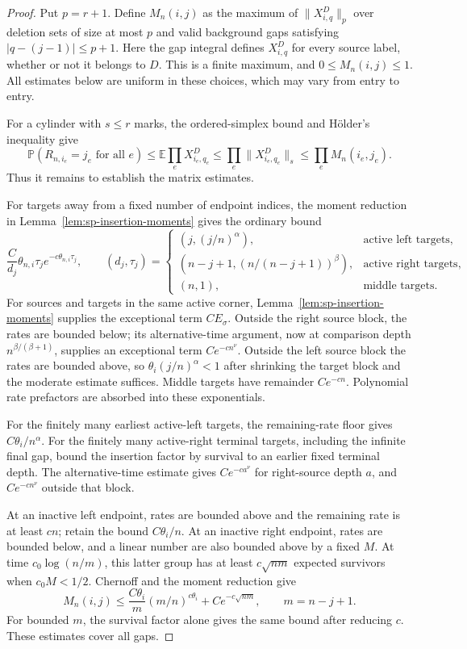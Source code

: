 \documentclass[11pt]{article}
\theoremstyle{remark}
\theoremstyle{plain}
\newcommand{\E}{\mathbb E}
\newcommand{\Pp}{\mathbb P}
\begin{document}
\begin{proof}
Put $p=r+1$.  Define $M_n(i,j)$ as the maximum of $\|X_{i,q}^D\|_p$
over deletion sets of size at most $p$ and valid background gaps satisfying
$|q-(j-1)|\le p+1$.  Here the gap integral defines $X_{i,q}^D$ for
every source label, whether or not it belongs to $D$.  This is a finite
maximum, and $0\le M_n(i,j)\le1$.  All estimates below are uniform in
these choices, which may vary from entry to entry.

For a cylinder with $s\le r$ marks, the ordered-simplex bound and
H\"older's inequality give
\[
 \Pp(R_{n,i_e}=j_e\text{ for all }e)
 \le \E\prod_eX_{i_e,q_e}^D
 \le\prod_e\|X_{i_e,q_e}^D\|_s
 \le\prod_eM_n(i_e,j_e).
\]
Thus it remains to establish the matrix estimates.

For targets away from a fixed number of endpoint indices, the moment
reduction in Lemma~\ref{lem:sp-insertion-moments} gives the ordinary bound
\begin{equation}\label{eq:sp-global-ordinary-kernel}
 \frac{C}{d_j}\theta_{n,i}\tau_j e^{-c\theta_{n,i}\tau_j},
 \qquad
 (d_j,\tau_j)=
 \begin{cases}
 (j,(j/n)^\alpha),&\text{active left targets},\\
 (n-j+1,(n/(n-j+1))^\beta),&\text{active right targets},\\
 (n,1),&\text{middle targets}.
 \end{cases}
\end{equation}
For sources and targets in the same active corner,
Lemma~\ref{lem:sp-insertion-moments} supplies the exceptional term
$CE_\sigma$.  Outside the right source block, the rates are bounded
below; its alternative-time argument, now at comparison depth
$n^{\beta/(\beta+1)}$, supplies an exceptional term $Ce^{-cn^\nu}$.
Outside the left source block the rates are bounded above, so
$\theta_i(j/n)^\alpha<1$ after shrinking the target block and the
moderate estimate suffices.  Middle targets have remainder $Ce^{-cn}$.
Polynomial rate prefactors are absorbed into these exponentials.

For the finitely many earliest active-left targets, the remaining-rate
floor gives $C\theta_i/n^\alpha$.  For the finitely many active-right
terminal targets, including the infinite final gap, bound the insertion
factor by survival to an earlier fixed terminal depth.  The
alternative-time estimate gives $Ce^{-ca^\nu}$ for right-source depth
$a$, and $Ce^{-cn^\nu}$ outside that block.

At an inactive left endpoint, rates are bounded above and the remaining
rate is at least $cn$; retain the bound $C\theta_i/n$.  At an inactive
right endpoint, rates are bounded below, and a linear number are also
bounded above by a fixed $M$.  At time $c_0\log(n/m)$, this latter
group has at least $c\sqrt{nm}$ expected survivors when $c_0M<1/2$.
Chernoff and the moment reduction give
\begin{equation}\label{eq:sp-inactive-terminal-kernel}
 M_n(i,j)\le
 \frac{C\theta_i}{m}(m/n)^{c\theta_i}
 +Ce^{-c\sqrt{nm}},\qquad m=n-j+1.
\end{equation}
For bounded $m$, the survival factor alone gives the same bound after
reducing $c$.  These estimates cover all gaps.


\end{proof}
\end{document}
